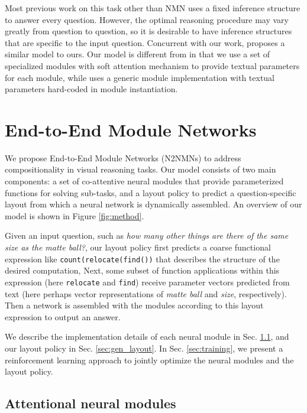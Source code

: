 \documentclass[10pt,twocolumn,letterpaper]{article}
\begin{document}
Most previous work on this task other than NMN uses a fixed inference structure to answer every question. However, the optimal reasoning procedure may vary greatly from question to question, so it is desirable to have inference structures that are specific to the input question. Concurrent with our work, \cite{johnson2017inferring} proposes a similar model to ours. Our model is different from \cite{johnson2017inferring} in that we use a set of specialized modules with soft attention mechanism to provide textual parameters for each module, while \cite{johnson2017inferring} uses a generic module implementation with textual parameters hard-coded in module instantiation.

\section{End-to-End Module Networks}

We propose End-to-End Module Networks (N2NMNs) to address compositionality in visual reasoning tasks. Our model consists of two main components: a set of co-attentive neural modules that provide parameterized functions for solving sub-tasks, and a layout policy to predict a question-specific layout from which a neural network is dynamically assembled. An overview of our model is shown in Figure \ref{fig:method}.

Given an input question, such as \emph{how many other things are there of the same size as the matte ball?}, our layout policy first predicts a coarse functional expression like \texttt{count(relocate(find())} that describes the structure of the desired computation, Next, some subset of function applications within this expression (here \texttt{relocate} and \texttt{find}) receive parameter vectors predicted from text (here perhaps vector representations of \emph{matte ball} and \emph{size}, respectively). Then a network is assembled with the modules according to this layout expression to output an answer.

We describe the implementation details of each neural module  in Sec. \ref{sec:modules}, and our layout policy in Sec. \ref{sec:gen_layout}. In Sec. \ref{sec:training}, we present a reinforcement learning approach to jointly optimize the neural modules and the layout policy.

\subsection{Attentional neural modules}\label{sec:modules}
\end{document}
